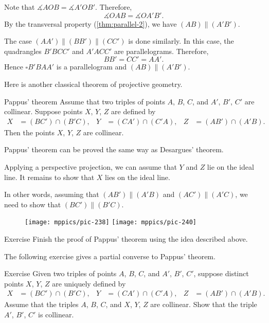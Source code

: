 Note that $\measuredangle AOB=\measuredangle A'OB'$.
Therefore, 
\[\measuredangle OAB=\measuredangle OA'B'.\]
By the transversal property (\ref{thm:parallel-2}), we have
$(AB)\parallel (A'B')$.

The case $(AA')\parallel(BB')\parallel(CC')$ is done similarly.
In this case, the quadrangles $B'BCC'$ and $A'ACC'$ are parallelograms.
Therefore, 
\[BB'=CC'=AA'.\]
Hence $\square B'BAA'$ is a parallelogram and $(AB)\parallel (A'B')$.
\qeds




Here is another classical theorem of projective geometry.

\begin{thm}{Pappus' theorem}\label{thm:pappus}
Assume that two triples of points $A$, $B$, $C$,
and $A'$, $B'$, $C'$ are collinear.
Suppose points $X$, $Y$, $Z$ are defined by
\begin{align*}
X&=(BC')\cap(B'C),
&
Y&=(CA')\cap(C'A),
&
Z&=(AB')\cap(A'B).
\end{align*}
Then the points $X$, $Y$, $Z$ are collinear.
\end{thm}


Pappus' theorem can be proved the same way as Desargues' theorem.

Applying a perspective projection, we can assume that $Y$ and $Z$ lie on the ideal line.
It remains to show that $X$ lies on the ideal line.

In other words, assuming that $(AB')\parallel (A'B)$ and $(AC')\parallel (A'C)$, we need to show that $(BC')\parallel(B'C)$.

\begin{figure}[!ht]
\centering
\texttt{[image: mppics/pic-238]}
\hskip15mm
\texttt{[image: mppics/pic-240]}
\end{figure}


\begin{thm}{Exercise}\label{ex:pappus}
Finish the proof of Pappus' theorem using the idea described above.
\end{thm}

The following exercise gives a partial converse to Pappus' theorem.

\begin{thm}{Exercise}\label{ex:pappus-converse}
Given two triples of points $A$, $B$, $C$,
and $A'$, $B'$, $C'$,
suppose distinct points $X$, $Y$, $Z$ are uniquely defined by
\begin{align*}
X&=(BC')\cap(B'C),
&
Y&=(CA')\cap(C'A),
&
Z&=(AB')\cap(A'B).
\end{align*}
Assume that the triples $A$, $B$, $C$,
and $X$, $Y$, $Z$ are collinear.
Show that the triple $A'$, $B'$, $C'$ is collinear.
\end{thm}

